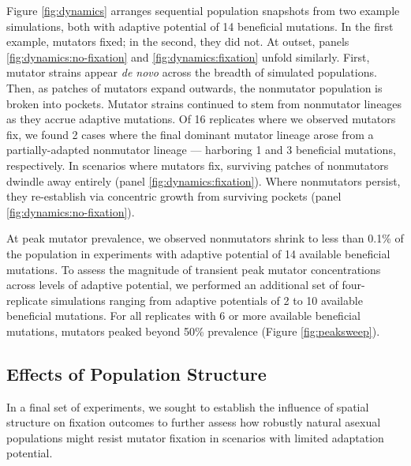 

Figure \ref{fig:dynamics} arranges sequential population snapshots from two example simulations, both with adaptive potential of 14 beneficial mutations.
In the first example, mutators fixed; in the second, they did not.
At outset, panels \ref{fig:dynamics:no-fixation} and \ref{fig:dynamics:fixation} unfold similarly.
First, mutator strains appear \textit{de novo} across the breadth of simulated populations.
Then, as patches of mutators expand outwards, the nonmutator population is broken into pockets.
Mutator strains continued to stem from nonmutator lineages as they accrue adaptive mutations.
Of 16 replicates where we observed mutators fix, we found 2 cases where the final dominant mutator lineage arose from a partially-adapted nonmutator lineage --- harboring 1 and 3 beneficial mutations, respectively.
In scenarios where mutators fix, surviving patches of nonmutators dwindle away entirely (panel \ref{fig:dynamics:fixation}).
Where nonmutators persist, they re-establish via concentric growth from surviving pockets (panel \ref{fig:dynamics:no-fixation}).



At peak mutator prevalence, we observed nonmutators shrink to less than 0.1\% of the population in experiments with adaptive potential of 14 available beneficial mutations.
To assess the magnitude of transient peak mutator concentrations across levels of adaptive potential, we performed an additional set of four-replicate simulations ranging from adaptive potentials of 2 to 10 available beneficial mutations.
For all replicates with 6 or more available beneficial mutations, mutators peaked beyond 50\% prevalence (Figure \ref{fig:peaksweep}).

\subsection{Effects of Population Structure}
\label{sec:population-structure}

In a final set of experiments, we sought to establish the influence of spatial structure on fixation outcomes to further assess how robustly natural asexual populations might resist mutator fixation in scenarios with limited adaptation potential.

